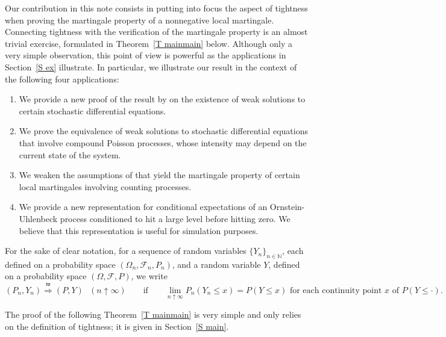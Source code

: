 Our contribution in this note consists in putting into focus the aspect of
tightness when proving the martingale property of a nonnegative local
martingale. Connecting tightness with the verification of the martingale
property is an almost trivial exercise, formulated in Theorem~\ref{T
mainmain} below. Although only a very simple observation, this point of view
is powerful as the applications in Section~\ref{S ex} illustrate. In
particular, we illustrate our result in the context of the following four
applications:

\begin{enumerate}
\item We provide a new proof of the result by \citet{Benes_1971} on the
existence of weak solutions to certain stochastic differential equations.

\item We prove the equivalence of weak solutions to stochastic differential equations that involve compound Poisson processes, whose
intensity may depend on the current state of the system.

\item We weaken the assumptions of \citet{Giesecke_2013} that yield the
martingale property of certain local martingales involving counting processes.

\item We provide a new representation for conditional expectations of an Ornstein-Uhlenbeck process conditioned to hit a large
level before hitting zero. We believe that this representation is useful for simulation purposes.
\end{enumerate}

For the sake of clear notation, for a sequence of random variables $%
\{Y_{n}\}_{n\in\mathbb{N}}$, each defined on a probability space $\left(
\Omega _{n},\mathcal{F}_{n},P_{n}\right) $, and a random variable $Y$,
defined on a probability space $\left( \Omega,\mathcal{F},P\right) $, we
write
\begin{equation*}
(P_{n},Y_{n})\overset{\mathfrak{w}}{\Longrightarrow}(P,Y) \text{ } (n
\uparrow \infty) \qquad \text{if} \qquad \lim_{n \uparrow \infty}
P_{n}\left( Y_{n}\leq x\right) = P\left( Y\leq x\right) \text{ for each
continuity point $x$ of $P\left( Y\leq \cdot\right)$}.
\end{equation*}

The proof of the following Theorem~\ref{T mainmain} is very simple and only
relies on the definition of tightness; it is given in Section~\ref{S main}.

